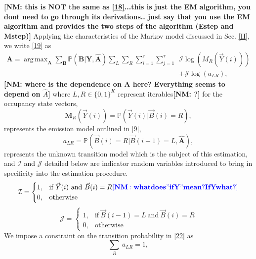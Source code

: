\documentclass[10pt,twocolumn]{IEEEtran}
\newcommand{\nm}[1]{{\color{blue}\bf{[NM: #1]}}}
\DeclareMathOperator*{\argmax}{arg\,max}
\begin{document}
\nm{this is NOT the same as \eqref{18}...this is just the EM algorithm, you dont need to go through its derivations.. just say that you use the EM algorithm and provides the two steps of the algorithm (Estep and Mstep)}
Applying the characteristics of the Markov model discussed in Sec. \ref{II}, we write \eqref{19} as
\begin{equation}\label{20}
    \begin{aligned}
        \mathbf{A}=\argmax_{\mathbf{A}}\sum_{\mathbf{B}}\mathbb{P}(\mathbf{B}|\mathbf{Y},\hat{\mathbf{A}})\sum_{L}\sum_{R}\sum_{i=1}^{\tau}\sum_{j=1}^{\tau}&\mathcal{I}\log(M_R(\vec{Y}(i)))\\
        &+\mathcal{J}\log(a_{LR}),
    \end{aligned}
\end{equation}
\nm{where is the dependence on A here? Everything seems to depend on $\hat A$}
where $L,R \in \{0,1\}^K$ represent iterables\nm{?} for the occupancy state vectors,
\begin{equation}\label{21}
    \mathbf{M}_R(\vec{Y}(i)) = \mathbb{P}(\vec{Y}(i)|\vec{B}(i)=R),
\end{equation}
represents the emission model outlined in \eqref{9},
\begin{equation}\label{22}
    a_{LR} = \mathbb{P}(\vec{B}(i)=R|\vec{B}(i-1)=L, \hat{\mathbf{A}}),
\end{equation}
represents the unknown transition model which is the subject of this estimation, and $\mathcal{I}$ and $\mathcal{J}$ detailed below are indicator random variables introduced to bring in specificity into the estimation procedure.
\begin{equation}\label{23}
    \mathcal{I} = 
    \begin{cases}
        1, &\text{if}\ \vec{Y}(i)\ \text{and}\ \vec{B}(i)=R\nm{what does "if Y" mean? If Y what?}\\
        0, &\text{otherwise}
    \end{cases}
\end{equation}
\begin{equation}\label{24}
    \mathcal{J} = 
    \begin{cases}
        1, &\text{if}\ \vec{B}(i-1)=L\ \text{and}\ \vec{B}(i)=R\\
        0, &\text{otherwise}
    \end{cases}
\end{equation}
We impose a constraint on the transition probability in \eqref{22} as 
\begin{equation}\label{25}
    \sum_{R}\ a_{LR} = 1,    
\end{equation}
\end{document}
